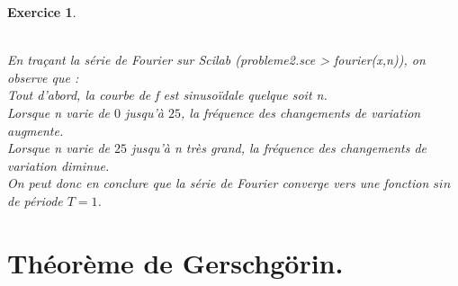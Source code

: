 \documentclass[a4paper,11pt]{article}
\newtheorem{exo}{Exercice}
\begin{document}
\begin{exo}
\begin{figure}[h]
\end{figure} \ \\
\newpage
En traçant la série de Fourier sur Scilab (probleme2.sce > fourier(x,n)), on observe que : \ \\
Tout d'abord, la courbe de f est sinusoïdale quelque soit n. \ \\
Lorsque n varie de $ 0 $ jusqu'à $ 25 $, la fréquence des changements de variation augmente. \ \\
Lorsque n varie de $ 25 $ jusqu'à n très grand, la fréquence des changements de variation diminue. \ \\
On peut donc en conclure que la série de Fourier converge vers une fonction $ sin $ de période $ T = 1 $.
\end{exo}

\section{Théorème de Gerschgörin.}
\end{document}
